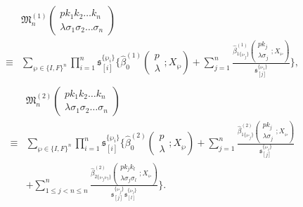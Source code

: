\begin{align}
& \mathfrak{M}_n^{(1)}\left( \begin{array}{cc}
pk_1k_2\ldots k_n\\\lambda\sigma_1\sigma_2\ldots\sigma_n
\end{array} \right)\nonumber\\
\equiv&\sum_{\wp\in\{I,F\}^n}\prod_{i=1}^{n}\mathfrak{s}^{\{\wp_i\}}_{[i]} \biggl\{ \hat{\beta}_0^{(1)}\left( \begin{array}{c}
p\\\lambda
\end{array};X_\wp\right)
+\sum_{j=1}^n\frac{\hat{\beta}_{1\{\wp_j\}}^{(1)}\left( \begin{array}{c}         
pk_j\\\lambda\sigma_j
\end{array};X_\wp\right)}{\mathfrak{s}^{\{\wp_i\}}_{[j]}} \biggr
\},\nonumber\\
\end{align}
\begin{align}
&\mathfrak{M}_n^{(2)}\left( \begin{array}{cc}
pk_1k_2\ldots k_n\\\lambda\sigma_1\sigma_2\ldots\sigma_n
\end{array} \right)\nonumber\\
\equiv&\sum_{\wp\in\{I,F\}^n}\prod_{i=1}^{n}\mathfrak{s}^{\{\wp_i\}}_{[i]} \biggl\{ \hat{\beta}_0^{(2)}\left( \begin{array}{c}
p\\\lambda
\end{array};X_\wp\right)
+\sum_{j=1}^n\frac{\hat{\beta}_{1\{\wp_j\}}^{(2)}\left( \begin{array}{c}         
	pk_j\\\lambda\sigma_j
	\end{array};X_\wp\right)}{\mathfrak{s}^{\{\wp_i\}}_{[j]}}\nonumber
\nonumber\\
&+\sum_{1\leq j<n\leq n}^n\frac{\hat{\beta}_{2\{\wp_j\wp_l\}}^{(2)}\left( \begin{array}{c}         
	pk_jk_l\\\lambda\sigma_j\sigma_l
	\end{array};X_\wp\right)}{\mathfrak{s}^{\{\wp_j\}}_{[j]}\mathfrak{s}^{\{\wp_l\}}_{[l]}}\nonumber
\biggr\}.\nonumber\\
\end{align}

